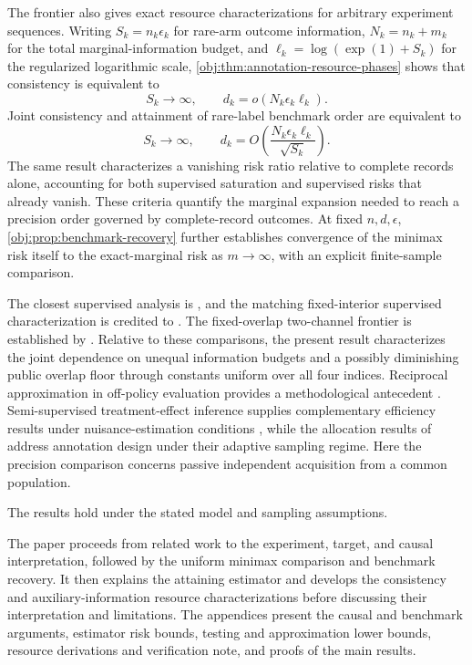 \documentclass[11pt]{article}
\begin{document}
The frontier also gives exact resource characterizations for arbitrary experiment sequences. Writing \(S_k=n_k\epsilon_k\) for rare-arm outcome information, \(N_k=n_k+m_k\) for the total marginal-information budget, and \(\ell_k=\log(\exp(1)+S_k)\) for the regularized logarithmic scale, \cref{obj:thm:annotation-resource-phases} shows that consistency is equivalent to
\[
S_k\longrightarrow\infty,
\qquad
d_k=o(N_k\epsilon_k\ell_k).
\]
Joint consistency and attainment of rare-label benchmark order are equivalent to
\[
S_k\longrightarrow\infty,
\qquad
d_k=O\!\left(\frac{N_k\epsilon_k\ell_k}{\sqrt{S_k}}\right).
\]
The same result characterizes a vanishing risk ratio relative to complete records alone, accounting for both supervised saturation and supervised risks that already vanish. These criteria quantify the marginal expansion needed to reach a precision order governed by complete-record outcomes. At fixed \(n,d,\epsilon\), \cref{obj:prop:benchmark-recovery} further establishes convergence of the minimax risk itself to the exact-marginal risk as \(m\to\infty\), with an explicit finite-sample comparison.

The closest supervised analysis is \citet[model (3), Theorems 1--2]{ZengBalakrishnanHanKennedy2026Discrete}, and the matching fixed-interior supervised characterization is credited to \citet[Theorem \texttt{thm:sharp-minimax-fixed-interior}]{InternalDiscreteATEPolynomialUpperMatch}. The fixed-overlap two-channel frontier is established by \citet[Theorem 4]{CausalSmith2026Annotation}. Relative to these comparisons, the present result characterizes the joint dependence on unequal information budgets and a possibly diminishing public overlap floor through constants uniform over all four indices. Reciprocal approximation in off-policy evaluation provides a methodological antecedent \citep[Section 3.3, Theorems 5--6]{MaZhuJiaoWainwright2022OPE}. Semi-supervised treatment-effect inference supplies complementary efficiency results under nuisance-estimation conditions \citep[Theorem 2.1 and Corollary 2.1]{ChakraborttyDai2024Semisupervised}, while the allocation results of \citet[Theorems 4.2 and 5.1 of the arXiv manuscript]{NwankwoGoldkindZhou2026Annotations} address annotation design under their adaptive sampling regime. Here the precision comparison concerns passive independent acquisition from a common population.

The results hold under the stated model and sampling assumptions.

The paper proceeds from related work to the experiment, target, and causal interpretation, followed by the uniform minimax comparison and benchmark recovery. It then explains the attaining estimator and develops the consistency and auxiliary-information resource characterizations before discussing their interpretation and limitations. The appendices present the causal and benchmark arguments, estimator risk bounds, testing and approximation lower bounds, resource derivations and verification note, and proofs of the main results.
\end{document}
